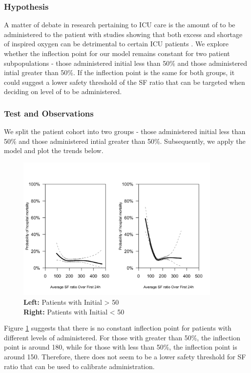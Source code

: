 \subsubsection{Hypothesis}
A matter of debate in research pertaining to ICU care is the amount of \Fi to be administered to the patient with studies showing that both excess and shortage of inspired oxygen can be detrimental to certain ICU patients \citep{rachmale2012practice}. We explore whether the inflection point for our model remains constant for two patient subpopulations - those administered initial \Fi less than 50\% and those administered intial \Fi greater than 50\%. If the inflection point is the same for both groups, it could suggest a lower safety threshold of the SF ratio that can be targeted when deciding on level of \Fi to be administered. 

\subsubsection{Test and Observations}

We split the patient cohort into two groups - those administered initial \Fi less than 50\% and those administered intial \Fi greater than 50\%. Subsequently, we apply the model and plot the trends below. 

\begin{figure}[H]
	\centering
	\includegraphics[width=0.9\textwidth]{figures/subgroupanalysis_fio2-1.png}
	\caption{\textbf{Left:} Patients with Initial \Fi > 50\\ \textbf{Right:} Patients with Initial \Fi < 50}
	\label{fig:subgroupanalysis_fio2-1}
\end{figure}

Figure \ref{fig:subgroupanalysis_fio2-1} suggests that there is no constant inflection point for patients with different levels of \Fi administered. For those with \Fi greater than 50\%, the inflection point is around 180, while for those with \Fi less than 50\%, the inflection point is around 150. Therefore, there does not seem to be a lower safety threshold for SF ratio that can be used to calibrate \Fi administration. 

